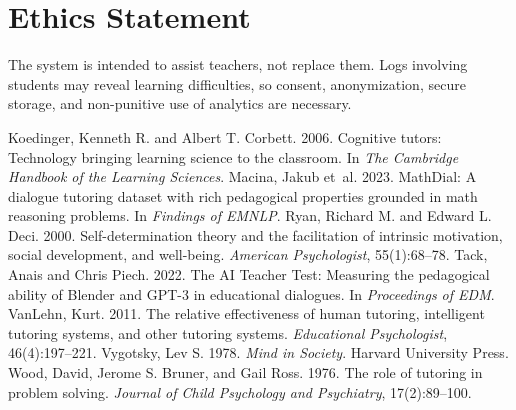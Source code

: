 \documentclass[11pt]{article}
\begin{document}
\section{Ethics Statement}
The system is intended to assist teachers, not replace them. Logs involving students may reveal learning difficulties, so consent, anonymization, secure storage, and non-punitive use of analytics are necessary.

\begin{thebibliography}{}
 Koedinger, Kenneth R. and Albert T. Corbett. 2006. Cognitive tutors: Technology bringing learning science to the classroom. In \emph{The Cambridge Handbook of the Learning Sciences}.
 Macina, Jakub et~al. 2023. MathDial: A dialogue tutoring dataset with rich pedagogical properties grounded in math reasoning problems. In \emph{Findings of EMNLP}.
 Ryan, Richard M. and Edward L. Deci. 2000. Self-determination theory and the facilitation of intrinsic motivation, social development, and well-being. \emph{American Psychologist}, 55(1):68--78.
 Tack, Anais and Chris Piech. 2022. The AI Teacher Test: Measuring the pedagogical ability of Blender and GPT-3 in educational dialogues. In \emph{Proceedings of EDM}.
 VanLehn, Kurt. 2011. The relative effectiveness of human tutoring, intelligent tutoring systems, and other tutoring systems. \emph{Educational Psychologist}, 46(4):197--221.
 Vygotsky, Lev S. 1978. \emph{Mind in Society}. Harvard University Press.
 Wood, David, Jerome S. Bruner, and Gail Ross. 1976. The role of tutoring in problem solving. \emph{Journal of Child Psychology and Psychiatry}, 17(2):89--100.
\end{thebibliography}
\end{document}
